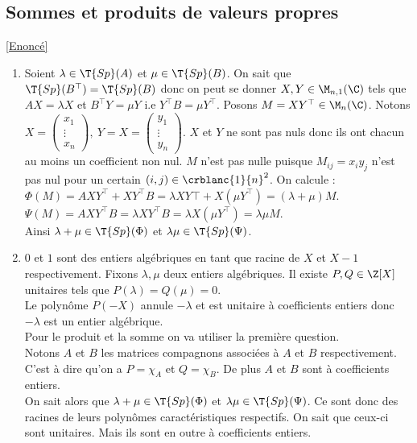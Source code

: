 \documentclass[8pt]{book}
\begin{document}
	\subsection{Sommes et produits de valeurs propres}
	\label{Sommes et produits de valeurs propres corrigé}
	\textcolor{blue}{\hyperref[Sommes et produits de valeurs propres]{[Enoncé]}}\\
	\begin{enumerate}[leftmargin=*]
		\item Soient $\lambda\in \T{Sp}(A)$ et $\mu\in \T{Sp}(B)$.
		On sait que $\T{Sp}(B^\top)=\T{Sp}(B)$ donc on peut se donner $X,Y\in \M_{n,1}(\C)$ tels que $AX=\lambda X$ et $B^\top Y=\mu Y$ i.e $Y^\top B=\mu Y^\top$. Posons $M=XY^\top\in \M_n(\C)$. Notons $X=\begin{pmatrix}
			x_1\\\vdots\\x_n
		\end{pmatrix},\ Y=X=\begin{pmatrix}
			y_1\\\vdots\\y_n
		\end{pmatrix}$. $X$ et $Y$ ne sont pas nuls donc ils ont chacun au moins un coefficient non nul. $M$ n'est pas nulle puisque $M_{ij}=x_iy_j$ n'est pas nul pour un certain $(i,j)\in \crblanc{1}{n}^2$. On calcule :\\
		$\Phi(M)=AXY^\top+XY^\top B=\lambda XY\top +X(\mu Y^\top)=(\lambda+\mu)M$.\\
		$\Psi(M)=AXY^\top B=\lambda XY^\top B=\lambda X(\mu Y^\top)=\lambda\mu M$.\\
		Ainsi $\lambda+\mu\in \T{Sp}(\Phi)$ et $\lambda\mu\in \T{Sp}(\Psi)$.
		\item $0$ et $1$ sont des entiers algébriques en tant que racine de $X$ et $X-1$ respectivement. Fixons $\lambda,\mu$ deux entiers algébriques. Il existe $P,Q\in \Z[X]$ unitaires tels que $P(\lambda)=Q(\mu)=0$.\\
		Le polynôme $P(-X)$ annule $-\lambda$ et est unitaire à coefficients entiers donc $-\lambda$ est un entier algébrique.\\
		Pour le produit et la somme on va utiliser la première question.\\
		Notons $A$ et $B$ les matrices compagnons associées à $A$ et $B$ respectivement. C'est à dire qu'on a $P=\chi_A$ et $Q=\chi_B$. De plus $A$ et $B$ sont à coefficients entiers.\\
		On sait alors que $\lambda+\mu\in \T{Sp}(\Phi)$ et $\lambda\mu\in \T{Sp}(\Psi)$. Ce sont donc des racines de leurs polynômes caractéristiques respectifs. On sait que ceux-ci sont unitaires. Mais ils sont en outre à coefficients entiers.\\

\end{enumerate}
\end{document}
